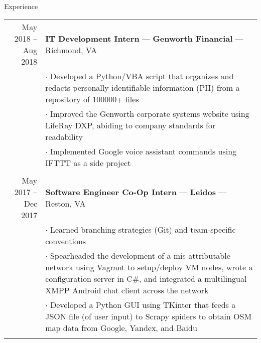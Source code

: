 \documentclass{resume} %
\begin{document}
\begin{rSection}{Experience}
\begin{tabular}{r|p{12cm}}
May 2018 -- Aug 2018 & \textbf{IT Development Intern} --- \textbf{Genworth Financial} --- Richmond, VA \\ 
	& $\cdot$ Developed a Python/VBA script that organizes and redacts personally identifiable information (PII) from a repository of 100000+ files \\
	& $\cdot$ Improved the Genworth corporate systems website using LifeRay DXP, abiding to company standards for readability \\
	& $\cdot$ Implemented Google voice assistant commands using IFTTT as a side project
\\ \multicolumn{2}{c}{} \\
May 2017 -- Dec 2017 & \textbf{Software Engineer Co-Op Intern} --- \textbf{Leidos} --- Reston, VA \\
	& $\cdot$ Learned branching strategies (Git) and team-specific conventions \\
	& $\cdot$ Spearheaded the development of a mis-attributable network using Vagrant to setup/deploy VM nodes, wrote a configuration server in C\#, and integrated a multilingual XMPP Android chat client across the network \\
	& $\cdot$ Developed a Python GUI using TKinter that feeds a JSON file (of user input) to Scrapy spiders to obtain OSM map data from Google, Yandex, and Baidu \\
\multicolumn{2}{c}{} 
\end{tabular}


\end{rSection}
\end{document}
